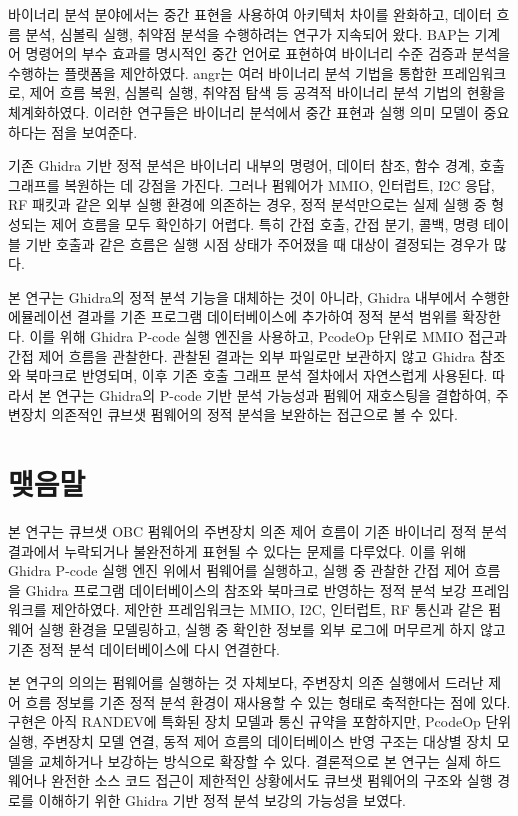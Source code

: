 \documentclass[master,korean,final]{kaist-ucs}
\begin{document}
바이너리 분석 분야에서는 중간 표현을 사용하여 아키텍처 차이를 완화하고, 데이터 흐름 분석, 심볼릭 실행, 취약점 분석을 수행하려는 연구가 지속되어 왔다. BAP는 기계어 명령어의 부수 효과를 명시적인 중간 언어로 표현하여 바이너리 수준 검증과 분석을 수행하는 플랫폼을 제안하였다\cite{BAP}. angr는 여러 바이너리 분석 기법을 통합한 프레임워크로, 제어 흐름 복원, 심볼릭 실행, 취약점 탐색 등 공격적 바이너리 분석 기법의 현황을 체계화하였다\cite{angrSOK}. 이러한 연구들은 바이너리 분석에서 중간 표현과 실행 의미 모델이 중요하다는 점을 보여준다.

기존 Ghidra 기반 정적 분석은 바이너리 내부의 명령어, 데이터 참조, 함수 경계, 호출 그래프를 복원하는 데 강점을 가진다. 그러나 펌웨어가 MMIO, 인터럽트, I2C 응답, RF 패킷과 같은 외부 실행 환경에 의존하는 경우, 정적 분석만으로는 실제 실행 중 형성되는 제어 흐름을 모두 확인하기 어렵다. 특히 간접 호출, 간접 분기, 콜백, 명령 테이블 기반 호출과 같은 흐름은 실행 시점 상태가 주어졌을 때 대상이 결정되는 경우가 많다.

본 연구는 Ghidra의 정적 분석 기능을 대체하는 것이 아니라, Ghidra 내부에서 수행한 에뮬레이션 결과를 기존 프로그램 데이터베이스에 추가하여 정적 분석 범위를 확장한다. 이를 위해 Ghidra P-code 실행 엔진을 사용하고, PcodeOp 단위로 MMIO 접근과 간접 제어 흐름을 관찰한다. 관찰된 결과는 외부 파일로만 보관하지 않고 Ghidra 참조와 북마크로 반영되며, 이후 기존 호출 그래프 분석 절차에서 자연스럽게 사용된다. 따라서 본 연구는 Ghidra의 P-code 기반 분석 가능성과 펌웨어 재호스팅을 결합하여, 주변장치 의존적인 큐브샛 펌웨어의 정적 분석을 보완하는 접근으로 볼 수 있다.

\chapter{맺음말}

본 연구는 큐브샛 OBC 펌웨어의 주변장치 의존 제어 흐름이 기존 바이너리 정적 분석 결과에서 누락되거나 불완전하게 표현될 수 있다는 문제를 다루었다. 이를 위해 Ghidra P-code 실행 엔진 위에서 펌웨어를 실행하고, 실행 중 관찰한 간접 제어 흐름을 Ghidra 프로그램 데이터베이스의 참조와 북마크로 반영하는 정적 분석 보강 프레임워크를 제안하였다. 제안한 프레임워크는 MMIO, I2C, 인터럽트, RF 통신과 같은 펌웨어 실행 환경을 모델링하고, 실행 중 확인한 정보를 외부 로그에 머무르게 하지 않고 기존 정적 분석 데이터베이스에 다시 연결한다.

본 연구의 의의는 펌웨어를 실행하는 것 자체보다, 주변장치 의존 실행에서 드러난 제어 흐름 정보를 기존 정적 분석 환경이 재사용할 수 있는 형태로 축적한다는 점에 있다. 구현은 아직 RANDEV에 특화된 장치 모델과 통신 규약을 포함하지만, PcodeOp 단위 실행, 주변장치 모델 연결, 동적 제어 흐름의 데이터베이스 반영 구조는 대상별 장치 모델을 교체하거나 보강하는 방식으로 확장할 수 있다. 결론적으로 본 연구는 실제 하드웨어나 완전한 소스 코드 접근이 제한적인 상황에서도 큐브샛 펌웨어의 구조와 실행 경로를 이해하기 위한 Ghidra 기반 정적 분석 보강의 가능성을 보였다.
\end{document}
